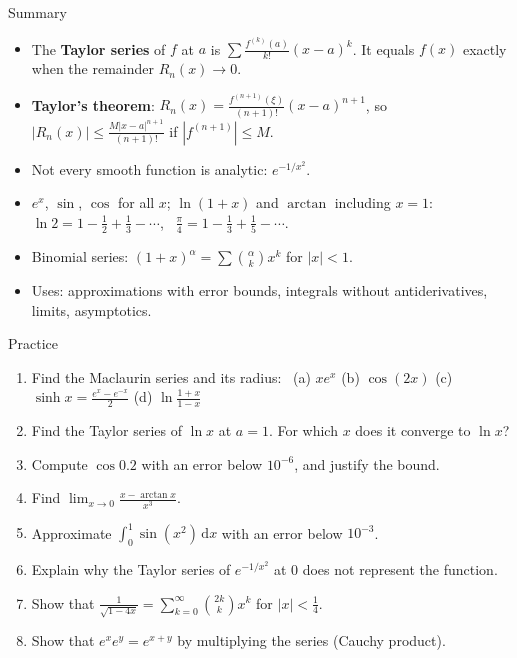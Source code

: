 \documentclass[10pt]{wosm-slides}
\newcommand{\dx}{\,\mathrm{d}x}
\begin{document}
\begin{frame}{Summary}
  \begin{itemize}
    \item The \textbf{Taylor series} of $f$ at $a$ is $\sum \frac{f^{(k)}(a)}{k!}(x - a)^k$.
      It equals $f(x)$ exactly when the remainder $R_n(x) \to 0$.
    \item \textbf{Taylor's theorem}: $R_n(x) = \frac{f^{(n+1)}(\xi)}{(n+1)!}(x - a)^{n+1}$, so
      $|R_n(x)| \le \frac{M |x - a|^{n+1}}{(n+1)!}$ if $|f^{(n+1)}| \le M$.
    \item Not every smooth function is analytic: $e^{-1/x^2}$.
    \item $e^x$, $\sin$, $\cos$ for all $x$; $\ln(1+x)$ and $\arctan$ including $x = 1$:
      $\ln 2 = 1 - \frac12 + \frac13 - \cdots$, \ $\frac\pi4 = 1 - \frac13 + \frac15 - \cdots$.
    \item Binomial series: $(1 + x)^\alpha = \sum \binom{\alpha}{k} x^k$ for $|x| < 1$.
    \item Uses: approximations with error bounds, integrals without antiderivatives,
      limits, asymptotics.
  \end{itemize}
\end{frame}

\begin{frame}{Practice}
  \small
  \begin{enumerate}
    \item Find the Maclaurin series and its radius: \
      (a) $x e^x$ \quad (b) $\cos(2x)$ \quad (c) $\sinh x = \frac{e^x - e^{-x}}{2}$ \quad
      (d) $\ln\frac{1+x}{1-x}$
    \item Find the Taylor series of $\ln x$ at $a = 1$. For which $x$ does it converge to $\ln x$?
    \item Compute $\cos 0.2$ with an error below $10^{-6}$, and justify the bound.
    \item Find $\displaystyle\lim_{x\to0} \frac{x - \arctan x}{x^3}$.
    \item Approximate $\int_0^1 \sin(x^2)\dx$ with an error below $10^{-3}$.
    \item Explain why the Taylor series of $e^{-1/x^2}$ at $0$ does not represent the function.
    \item Show that $\frac{1}{\sqrt{1 - 4x}} = \sum_{k=0}^\infty \binom{2k}{k} x^k$ for $|x| < \frac14$.
    \item Show that $e^{x}e^{y} = e^{x+y}$ by multiplying the series (Cauchy product).
  \end{enumerate}
\end{frame}
\end{document}
